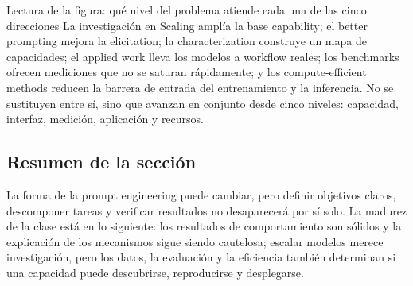 
\begin{knowledgebox}{Lectura de la figura: qué nivel del problema atiende cada una de las cinco direcciones}
La investigación en Scaling amplía la base capability; el better prompting mejora la elicitation; la characterization construye un mapa de capacidades; el applied work lleva los modelos a workflow reales; los benchmarks ofrecen mediciones que no se saturan rápidamente; y los compute-efficient methods reducen la barrera de entrada del entrenamiento y la inferencia. No se sustituyen entre sí, sino que avanzan en conjunto desde cinco niveles: capacidad, interfaz, medición, aplicación y recursos.
\end{knowledgebox}


\subsection{Resumen de la sección}

La forma de la prompt engineering puede cambiar, pero definir objetivos claros, descomponer tareas y verificar resultados no desaparecerá por sí solo. La madurez de la clase está en lo siguiente: los resultados de comportamiento son sólidos y la explicación de los mecanismos sigue siendo cautelosa; escalar modelos merece investigación, pero los datos, la evaluación y la eficiencia también determinan si una capacidad puede descubrirse, reproducirse y desplegarse.

